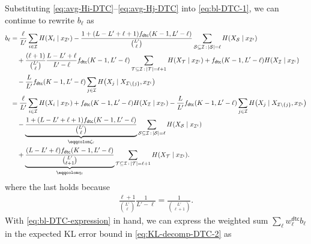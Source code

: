 \documentclass[english]{article}
\newcommand{\defnrev}{\eqqcolon}
\newcommand{\cS}{\mathcal{S}}
\newcommand{\cI}{\mathcal{I}}
\newcommand{\cT}{\mathcal{T}}
\newcommand{\dtc}{\mathsf{dtc}}
\begin{document}
Substituting \eqref{eq:avg-Hi-DTC}--\eqref{eq:avg-Hj-DTC} into \eqref{eq:bl-DTC-1}, we can continue to rewrite $b_\ell$ as
\begin{align}
    b_{\ell}&= \frac{\ell}{L'} \sum_{i \in \cI} H(X_i \mid x_{\cI^\mathsf{c}}) - \frac{1 + (L-L'+\ell+1) f_\dtc(K-1, L'-\ell)}{\binom{L'}{\ell}} \sum_{\cS \subseteq \cI \,:\, |\cS|=\ell} H(X_{\cS} \mid x_{\cI^\mathsf{c}}) \notag\\
    &\quad + \frac{(\ell + 1)}{\binom{L'}{\ell}}\frac{L-L'+\ell}{L'-\ell} f_\dtc(K-1, L'-\ell) \sum_{\cT \subseteq \cI \,:\, |\cT|=\ell+1} H(X_{\cT} \mid x_{\cI^\mathsf{c}}) + f_\dtc(K-1, L'-\ell) H(X_{\cI} \mid x_{\cI^\mathsf{c}}) \notag \\
    & \quad - \frac{L}{L'}f_\dtc(K-1, L'-\ell) \sum_{j \in \cI} H\big(X_j \mid X_{\cI \setminus \{j\}}, x_{\cI^\mathsf{c}}\big)  \notag\\
    &= \frac{\ell}{L'} \sum_{i \in \cI} H(X_i \mid x_{\cI^\mathsf{c}}) + f_\dtc(K-1, L'-\ell) H(X_{\cI} \mid x_{\cI^\mathsf{c}}) - \frac{L}{L'}f_\dtc(K-1, L'-\ell) \sum_{j \in \cI} H\big(X_j \mid X_{\cI \setminus \{j\}}, x_{\cI^\mathsf{c}}\big)  \notag \\
    &\quad - \underbrace{\frac{1 + (L-L'+\ell+1) f_\dtc(K-1, L'-\ell)}{\binom{L'}{\ell}}}_{\defnrev\zeta_\ell}\sum_{\cS \subseteq \cI \,:\, |\cS|=\ell} H(X_{\cS} \mid x_{\cI^\mathsf{c}}) \notag\\
    &\quad + \underbrace{\frac{(L-L'+\ell) f_\dtc(K-1, L'-\ell)}{\binom{L'}{\ell + 1}}}_{\defnrev\eta_\ell} \sum_{\cT \subseteq \cI \,:\, |\cT|=\ell+1} H(X_{\cT} \mid x_{\cI^\mathsf{c}}).  \label{eq:bl-DTC-expression}
\end{align}
where the last holds because
\begin{align*}
\frac{\ell + 1}{\binom{L'}{\ell}}\frac{1}{L'-\ell} = \frac{1}{\binom{L'}{\ell + 1}}.
\end{align*}
With \eqref{eq:bl-DTC-expression} in hand, we can express the weighted sum $ \sum_{\ell} w^\dtc_{\ell} b_{\ell} $ in the expected KL error bound in \eqref{eq:KL-decomp-DTC-2} as
\end{document}
